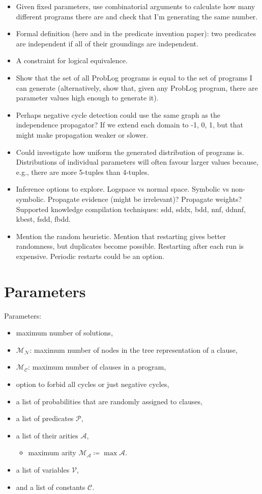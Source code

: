 \documentclass[runningheads]{llncs}
\newcommand{\predicates}{\mathcal{P}}
\newcommand{\variables}{\mathcal{V}}
\newcommand{\constants}{\mathcal{C}}
\newcommand{\arities}{\mathcal{A}}
\newcommand{\maxArity}{\mathcal{M}_{\mathcal{A}}}
\newcommand{\maxNumNodes}{\mathcal{M}_{\mathcal{N}}}
\newcommand{\maxNumClauses}{\mathcal{M}_{\mathcal{C}}}
\begin{document}
\begin{itemize}
\item Given fixed parameters, use combinatorial arguments to calculate how many
  different programs there are and check that I'm generating the same number.
\item Formal definition (here and in the predicate invention paper): two
  predicates are independent if all of their groundings are independent.
\item A constraint for logical equivalence.
\item Show that the set of all ProbLog programs is equal to the set of programs
  I can generate (alternatively, show that, given any ProbLog program, there are
  parameter values high enough to generate it).
\item Perhaps negative cycle detection could use the same graph as the
  independence propagator? If we extend each domain to {-1, 0, 1}, but that
  might make propagation weaker or slower.
\item Could investigate how uniform the generated distribution of programs is.
  Distributions of individual parameters will often favour larger values
  because, e.g., there are more 5-tuples than 4-tuples.
\item Inference options to explore. Logspace vs normal space. Symbolic vs
  non-symbolic. Propagate evidence (might be irrelevant)? Propagate weights?
  Supported knowledge compilation techniques: sdd, sddx, bdd, nnf, ddnnf, kbest,
  fsdd, fbdd.
\item Mention the random heuristic. Mention that restarting gives better
  randomness, but duplicates become possible. Restarting after each run is
  expensive. Periodic restarts could be an option.
\end{itemize}

\section{Parameters}

Parameters:
\begin{itemize}
\item maximum number of solutions,
\item $\maxNumNodes{}$: maximum number of nodes in the tree representation of a
  clause,
\item $\maxNumClauses{}$: maximum number of clauses in a program,
\item option to forbid all cycles or just negative cycles,
\item a list of probabilities that are randomly assigned to clauses,
\item a list of predicates $\predicates{}$,
\item a list of their arities $\arities{}$,
  \begin{itemize}
  \item maximum arity $\maxArity{} \coloneqq \max \arities{}$.
  \end{itemize}
\item a list of variables $\variables{}$,
\item and a list of constants $\constants{}$.
\end{itemize}
\end{document}
